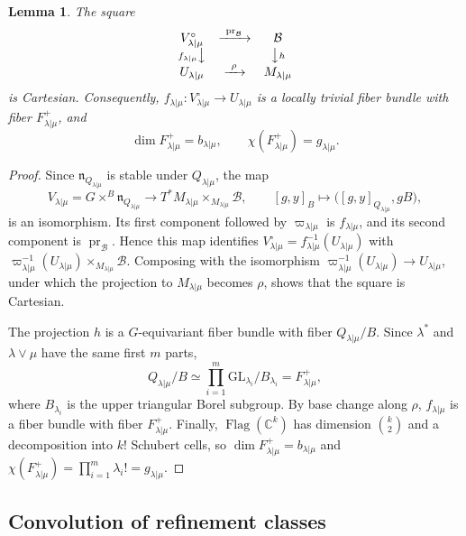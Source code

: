 \documentclass[11pt,a4paper]{amsart}
\newtheorem{lemma}[theorem]{Lemma}
\theoremstyle{definition}
\theoremstyle{remark}
\newcommand{\C}{\mathbb C}
\newcommand{\B}{\mathcal B}
\newcommand{\Flag}{\operatorname{Flag}}
\newcommand{\pr}{\operatorname{pr}}
\newcommand{\lm}{\lambda|\mu}
\numberwithin{equation}{section}
\begin{document}
\begin{lemma}\label{lem:refinement-fibers}
The square
\begin{equation}\label{eq:refine-cartesian}
\begin{array}{ccc}
V^\circ_{\lm}&\xrightarrow{\ \pr_\B\ }&\B\\
{\scriptstyle f_{\lm}}\big\downarrow&&\big\downarrow{\scriptstyle h}\\
U_{\lm}&\xrightarrow{\ \rho\ }&M_{\lm}
\end{array}
\end{equation}
is Cartesian. Consequently, $f_{\lm}:V^\circ_{\lm}\to U_{\lm}$ is a
locally trivial fiber bundle with fiber $F_{\lm}^+$, and
$$
\dim F_{\lm}^+=b_{\lm},\qquad \chi(F_{\lm}^+)=g_{\lm}.
$$
\end{lemma}
\begin{proof}
Since $\mathfrak n_{Q_{\lm}}$ is stable under $Q_{\lm}$, the map
$$
V_{\lm}=G\times^B\mathfrak n_{Q_{\lm}}\longrightarrow
T^*M_{\lm}\times_{M_{\lm}}\B,\qquad
[g,y]_B\longmapsto\bigl([g,y]_{Q_{\lm}},gB\bigr),
$$
is an isomorphism. Its first component followed by $\varpi_{\lm}$ is
$f_{\lm}$, and its second component is $\pr_\B$. Hence this map identifies
$V^\circ_{\lm}=f_{\lm}^{-1}(U_{\lm})$ with
$\varpi_{\lm}^{-1}(U_{\lm})\times_{M_{\lm}}\B$. Composing with the
isomorphism $\varpi_{\lm}^{-1}(U_{\lm})\to U_{\lm}$, under which the
projection to $M_{\lm}$ becomes $\rho$, shows that the square is
Cartesian.

The projection $h$ is a $G$-equivariant fiber bundle with fiber
$Q_{\lm}/B$. Since $\lambda^*$ and $\lambda\vee\mu$ have the same first
$m$ parts,
$$
Q_{\lm}/B\simeq\prod_{i=1}^m\mathrm{GL}_{\lambda_i}/B_{\lambda_i}
=F_{\lm}^+,
$$
where $B_{\lambda_i}$ is the upper triangular Borel subgroup. By base
change along $\rho$, $f_{\lm}$ is a fiber bundle with fiber $F_{\lm}^+$.
Finally, $\Flag(\C^k)$ has dimension $\binom k2$ and a decomposition into
$k!$ Schubert cells, so $\dim F_{\lm}^+=b_{\lm}$ and
$\chi(F_{\lm}^+)=\prod_{i=1}^m\lambda_i!=g_{\lm}$.
\end{proof}

\subsection{Convolution of refinement classes}
\end{document}
